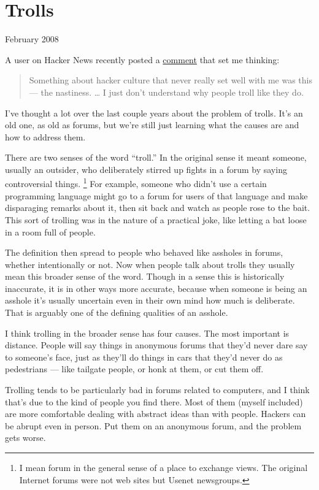 \chapter{Trolls}

February 2008

A user on Hacker News recently posted a
\href{http://news.ycombinator.com/item?id=116938}{comment} that set me
thinking:

\begin{quote}
Something about hacker culture that never really set well with me was
this --- the nastiness. \ldots{} I just don't understand why people
troll like they do.
\end{quote}

I've thought a lot over the last couple years about the problem of
trolls. It's an old one, as old as forums, but we're still just learning
what the causes are and how to address them.

There are two senses of the word ``troll.'' In the original sense it
meant someone, usually an outsider, who deliberately stirred up fights
in a forum by saying controversial things. \footnote{I mean forum in the general sense of a place to exchange views.
The original Internet forums were not web sites but Usenet newsgroups.} For
example, someone who didn't use a certain programming language might go
to a forum for users of that language and make disparaging remarks about
it, then sit back and watch as people rose to the bait. This sort of
trolling was in the nature of a practical joke, like letting a bat loose
in a room full of people.

The definition then spread to people who behaved like assholes in
forums, whether intentionally or not. Now when people talk about trolls
they usually mean this broader sense of the word. Though in a sense this
is historically inaccurate, it is in other ways more accurate, because
when someone is being an asshole it's usually uncertain even in their
own mind how much is deliberate. That is arguably one of the defining
qualities of an asshole.

I think trolling in the broader sense has four causes. The most
important is distance. People will say things in anonymous forums that
they'd never dare say to someone's face, just as they'll do things in
cars that they'd never do as pedestrians --- like tailgate people, or
honk at them, or cut them off.

Trolling tends to be particularly bad in forums related to computers,
and I think that's due to the kind of people you find there. Most of
them (myself included) are more comfortable dealing with abstract ideas
than with people. Hackers can be abrupt even in person. Put them on an
anonymous forum, and the problem gets worse.

